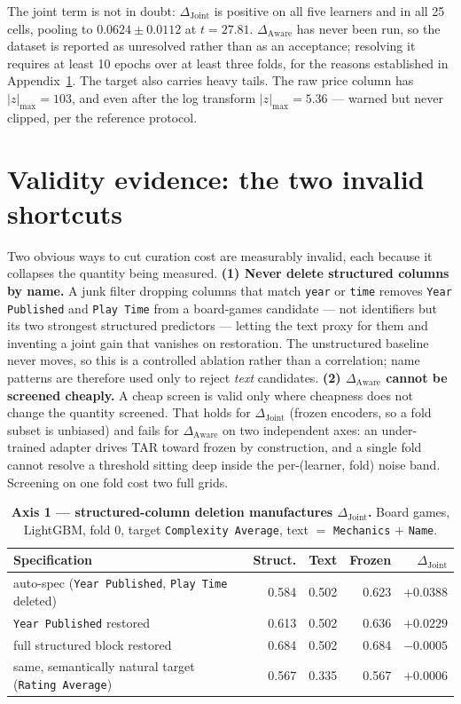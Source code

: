 \documentclass[10pt,letterpaper]{article}
\newcommand{\dj}{\Delta_{\mathrm{Joint}}}
\newcommand{\da}{\Delta_{\mathrm{Aware}}}
\begin{document}
\noindent The joint term is not in doubt: $\dj$ is positive on all five learners and in all 25 cells,
pooling to $0.0624 \pm 0.0112$ at $t = 27.81$. $\da$ has never been run, so the dataset is
reported as unresolved rather than as an acceptance; resolving it requires at least 10 epochs
over at least three folds, for the reasons established in Appendix~\ref{app:validity}. The
target also carries heavy tails. The raw price column has $|z|_{\max} = 103$, and even after
the log transform $|z|_{\max} = 5.36$ --- warned but never clipped, per the reference
protocol.


\section{Validity evidence: the two invalid shortcuts}
\label{app:validity}

\noindent Two obvious ways to cut curation cost are measurably invalid, each because it
collapses the quantity being measured. \textbf{(1) Never delete structured columns by name.} A
junk filter dropping columns that match \texttt{year} or \texttt{time} removes \texttt{Year
Published} and \texttt{Play Time} from a board-games candidate --- not identifiers but its two
strongest structured predictors --- letting the text proxy for them and inventing a joint gain
that vanishes on restoration. The unstructured baseline never moves, so this is a controlled
ablation rather than a correlation; name patterns are therefore used only to reject \emph{text}
candidates. \textbf{(2) $\da$ cannot be screened cheaply.} A cheap screen is valid only where
cheapness does not change the quantity screened. That holds for $\dj$ (frozen encoders, so a
fold subset is unbiased) and fails for $\da$ on two independent axes: an under-trained adapter
drives TAR toward frozen by construction, and a single fold cannot resolve a threshold sitting
deep inside the per-(learner, fold) noise band. Screening on one fold cost two full grids.

\begin{table}[H]
\centering\small
\caption{\textbf{Axis 1 --- structured-column deletion manufactures $\dj$.} Board games,
LightGBM, fold 0, target \texttt{Complexity Average}, text $=$ \texttt{Mechanics} $+$
\texttt{Name}.}
\begin{tabular}{lrrrr}
\toprule
Specification & Struct. & Text & Frozen & $\dj$ \\
\midrule
auto-spec (\texttt{Year Published}, \texttt{Play Time} deleted) & 0.584 & 0.502 & 0.623 & $\mathbf{+0.0388}$ \\
\texttt{Year Published} restored & 0.613 & 0.502 & 0.636 & $+0.0229$ \\
full structured block restored & 0.684 & 0.502 & 0.684 & $\mathbf{-0.0005}$ \\
\midrule
same, semantically natural target (\texttt{Rating Average}) & 0.567 & 0.335 & 0.567 & $+0.0006$ \\
\bottomrule
\end{tabular}
\end{table}
\end{document}
